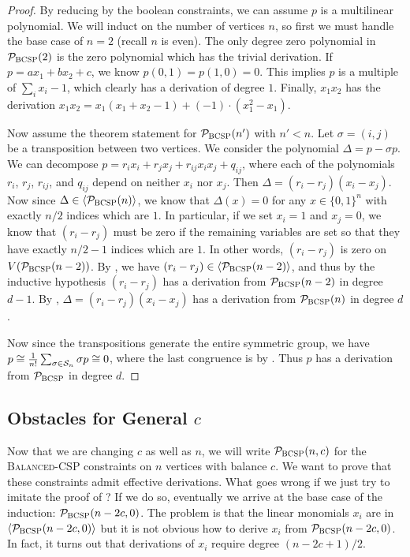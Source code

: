\begin{proof}
By reducing by the boolean constraints, we can assume $p$ is a multilinear polynomial. 
We will induct on the number of vertices $n$, so first we must handle the base case of $n = 2$ (recall $n$ is even). 
The only degree zero polynomial in $\mathcal P_{\textsc{BCSP}}(2)$ is the zero polynomial which has the trivial derivation. 
If $p = ax_1 + bx_2 + c$, we know $p(0,1) = p(1,0) = 0$. This implies $p$ is a multiple of $\sum_i x_i - 1$, which clearly has a derivation of degree $1$.
Finally, $x_1x_2$ has the derivation $x_1x_2 = x_1(x_1+x_2-1) + (-1)\cdot(x_1^2 - x_1)$.

Now assume the theorem statement for $\mathcal P_{\textsc{BCSP}}(n')$ with $n' < n$. 
Let $\sigma = (i,j)$ be a transposition between two vertices. 
We consider the polynomial $\Delta = p - \sigma p$. 
We can decompose $p = r_i x_i + r_j x_j + r_{ij} x_ix_j + q_{ij}$, where each of the polynomials $r_i$, $r_j$, $r_{ij}$, and $q_{ij}$ depend on neither $x_i$ nor $x_j$. Then $\Delta = (r_i - r_j)(x_i - x_j)$. Now since $\Delta \in \langle \mathcal P_{\textsc{BCSP}}(n) \rangle$, we know that $\Delta(x) = 0$ for any $x \in \{0,1\}^n$ with exactly $n/2$ indices which are $1$. In particular, if we set $x_i = 1$ and $x_j = 0$, we know that $(r_i - r_j)$ must be zero if the remaining variables are set so that they have exactly $n/2 - 1$ indices which are $1$. In other words, $(r_i - r_j)$ is zero on $V(\mathcal P_{\textsc{BCSP}}(n-2))$. By , we have $(r_i - r_j) \in \langle \mathcal P_{\textsc{BCSP}}(n-2) \rangle$, and thus by the inductive hypothesis $(r_i - r_j)$ has a derivation from $\mathcal P_{\textsc{BCSP}}(n-2)$ in degree $d-1$. By , $\Delta = (r_i - r_j)(x_i - x_j)$ has a derivation from $\mathcal P_{\textsc{BCSP}}(n)$ in degree $d$. 

Now since the transpositions generate the entire symmetric group, we have $p \cong \frac{1}{n!} \sum_{\sigma \in \mathcal S_n} \sigma p \cong 0$, where the last congruence is by . Thus $p$ has a derivation from $\mathcal P_{\textsc{BCSP}}$ in degree $d$. 
\end{proof}

\subsection{Obstacles for General $c$}
Now that we are changing $c$ as well as $n$, we will write $\mathcal P_{\textsc{BCSP}}(n,c)$ for the \textsc{Balanced-CSP} constraints on $n$ vertices with balance $c$.
We want to prove that these constraints admit effective derivations.
What goes wrong if we just try to imitate the proof of ?
If we do so, eventually we arrive at the base case of the induction: $\mathcal P_{\textsc{BCSP}}(n-2c,0)$.
The problem is that the linear monomials $x_i$ are in $\langle \mathcal P_{\textsc{BCSP}}(n-2c,0) \rangle$ but it is not obvious how to derive $x_i$ from $\mathcal P_{\textsc{BCSP}}(n-2c,0)$. 
In fact, it turns out that derivations of $x_i$ require degree $(n-2c+1)/2$. 

